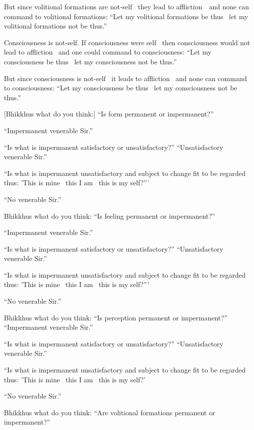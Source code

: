 But since volitional formations are not-self \breathmark\ they lead to \mbox{affliction}~\breathmark\ and none can command to volitional formations: ``Let my volitional formations be thus \breathmark\ let my volitional formations not be thus.''

Consciousness is not-self. If consciousness were self \breathmark\ then consciousness would not lead to affliction \breathmark\ and one could command to consciousness: ``Let my consciousness be thus \breathmark\ let my consciousness not be thus.''

But since consciousness is not-self \breathmark\ it leads to affliction \breathmark\ and none can command to consciousness: ``Let my consciousness be thus \breathmark\ let my consciousness not be thus.''

[Bhikkhus what do you think:] ``Is form permanent or impermanent?''

``Impermanent venerable Sir.''

``Is what is impermanent satisfactory or unsatisfactory?'' ``Unsatisfactory venerable Sir.''

``Is what is impermanent unsatisfactory and subject to change fit to be regarded thus: 'This is mine \breathmark\ this I am \breathmark\ this is my self?'''

``No venerable Sir.''

Bhikkhus what do you think: ``Is feeling permanent or impermanent?''

``Impermanent venerable Sir.''

``Is what is impermanent satisfactory or unsatisfactory?'' ``Unsatisfactory venerable Sir.''

``Is what is impermanent unsatisfactory and subject to change fit to be regarded thus: 'This is mine \breathmark\ this I am \breathmark\ this is my self?'''

``No venerable Sir.''

Bhikkhus what do you think: ``Is perception permanent or impermanent?'' ``Impermanent venerable Sir.''

``Is what is impermanent satisfactory or unsatisfactory?'' ``Unsatisfactory venerable Sir.''

``Is what is impermanent unsatisfactory and subject to change fit to be regarded thus: 'This is mine \breathmark\ this I am \breathmark\ this is my self?'

``No venerable Sir.''

Bhikkhus what do you think: ``Are volitional formations permanent or impermanent?''

